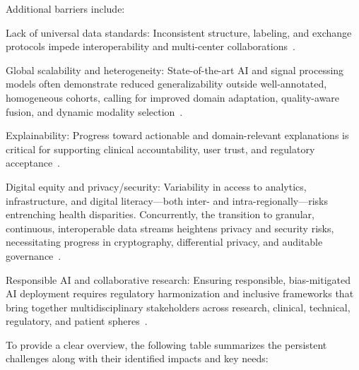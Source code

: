 \documentclass[sigconf]{acmart}
\begin{document}
Additional barriers include:

Lack of universal data standards: Inconsistent structure, labeling, and exchange protocols impede interoperability and multi-center collaborations~\cite{ref88,ref89,ref92}.

Global scalability and heterogeneity: State-of-the-art AI and signal processing models often demonstrate reduced generalizability outside well-annotated, homogeneous cohorts, calling for improved domain adaptation, quality-aware fusion, and dynamic modality selection~\cite{ref39,ref47,ref94,ref96}. 

Explainability: Progress toward actionable and domain-relevant explanations is critical for supporting clinical accountability, user trust, and regulatory acceptance~\cite{ref34,ref51,ref76,ref87}.

Digital equity and privacy/security: Variability in access to analytics, infrastructure, and digital literacy—both inter- and intra-regionally—risks entrenching health disparities. Concurrently, the transition to granular, continuous, interoperable data streams heightens privacy and security risks, necessitating progress in cryptography, differential privacy, and auditable governance~\cite{ref92,ref95,ref99,ref101,ref51,ref95}.

Responsible AI and collaborative research: Ensuring responsible, bias-mitigated AI deployment requires regulatory harmonization and inclusive frameworks that bring together multidisciplinary stakeholders across research, clinical, technical, regulatory, and patient spheres~\cite{ref5,ref13,ref16,ref17,ref18,ref19,ref20,ref21,ref22,ref23,ref24,ref25,ref28,ref30,ref31,ref32,ref33,ref34,ref35,ref36,ref37,ref38,ref39,ref40,ref41,ref42,ref43,ref44,ref45,ref46,ref47,ref48,ref49,ref50,ref51,ref52,ref53,ref54,ref55,ref56,ref57,ref58,ref59,ref60,ref61,ref62,ref63,ref64,ref65,ref66,ref67,ref68,ref69,ref70,ref71,ref72,ref73,ref74,ref75,ref76,ref77,ref78,ref79,ref80,ref81,ref82,ref83,ref84,ref85,ref86,ref87,ref88,ref89,ref90,ref91,ref92,ref94,ref95,ref96,ref97,ref98,ref99,ref100,ref101,ref102,ref103,ref104,ref105,ref106,ref107}.

To provide a clear overview, the following table summarizes the persistent challenges along with their identified impacts and key needs:
\end{document}
